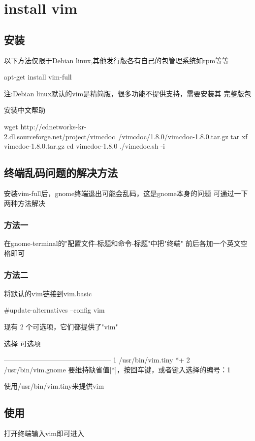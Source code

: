 \chapter{install vim}

\section{安装}
以下方法仅限于Debian linux,其他发行版各有自己的包管理系统如rpm等等
\begin{code}
apt-get install vim-full
\end{code}
注:Debian linux默认的vim是精简版，很多功能不提供支持，需要安装其
完整版包

安装中文帮助
\begin{code}
wget http://cdnetworks-kr-2.dl.sourceforge.net/project/vimcdoc\
/vimcdoc/1.8.0/vimcdoc-1.8.0.tar.gz
tar xf vimcdoc-1.8.0.tar.gz 
cd vimcdoc-1.8.0
./vimcdoc.sh -i
\end{code}

\section{终端乱码问题的解决方法}
安装vim-full后，gnome终端退出可能会乱码，这是gnome本身的问题
可通过一下两种方法解决
\subsection{方法一}
在gnome-terminal的"配置文件-标题和命令-标题"中把"终端"
前后各加一个英文空格即可
\subsection{方法二}
将默认的vim链接到vim.basic
\begin{code}
#update-alternatives --config vim
\end{code}

现有 2 个可选项，它们都提供了"vim"

    选择        可选项
\begin{code}
-----------------------------------------------
          1    /usr/bin/vim.tiny
*+        2    /usr/bin/vim.gnome
要维持缺省值[*]，按回车键，或者键入选择的编号：1
\end{code}
使用/usr/bin/vim.tiny来提供vim

\section{使用}
打开终端输入vim即可进入
\newpage
